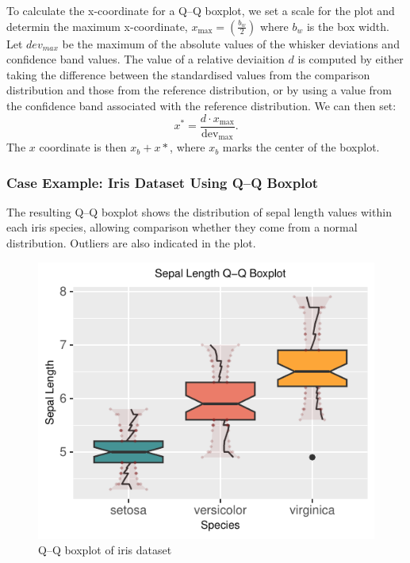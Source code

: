 \documentclass{article}\usepackage[]{graphicx}\usepackage[]{xcolor}
\makeatletter
\def\maxwidth{ %
  \ifdim\Gin@nat@width>\linewidth
    \linewidth
  \else
    \Gin@nat@width
  \fi
}
\newenvironment{knitrout}{}{} %
\numberwithin{equation}{section}
\makeatother
\begin{document}
\noindent
To calculate the x-coordinate for a Q–Q boxplot, we set a scale for the plot and determin the maximum x-coordinate, $x_{\text{max}}=(\frac{b_w}{2})$ where $b_w$ is the box width. Let $dev_{max}$ be the maximum of the absolute values of the whisker deviations and confidence band values. The value of a relative deviaition $d$ is computed by either taking the difference between the standardised values from the comparison distribution and those from the reference distribution, or by using a value from the confidence band associated with the reference distribution. We can then set:
$$x^* = \frac{d \cdot x_{\text{max}}}{\text{dev}_{\text{max}}}.$$
The $x$ coordinate is then $x_b+x*$, where $x_b$ marks the center of the boxplot.

\newpage
\subsubsection{Case Example: Iris Dataset Using Q–Q Boxplot}
The resulting Q–Q boxplot shows the distribution of sepal length values within each iris species, allowing comparison whether they come from a normal distribution. Outliers are also indicated in the plot.\\

\begin{knitrout}\scriptsize
{}\color{fgcolor}\begin{figure}[h]

{\centering \includegraphics[width=\maxwidth]{figure/beamer-QQboxplots-1} 

}

\caption[Q–Q boxplot of iris dataset]{Q–Q boxplot of iris dataset}\label{fig:QQboxplots}
\end{figure}

\end{knitrout}
\end{document}
